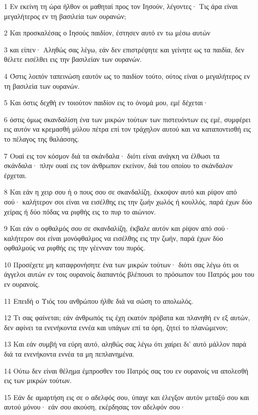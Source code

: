 \par 1 Εν εκείνη τη ώρα ήλθον οι μαθηταί προς τον Ιησούν, λέγοντες· Τις άρα είναι μεγαλήτερος εν τη βασιλεία των ουρανών;
\par 2 Και προσκαλέσας ο Ιησούς παιδίον, έστησεν αυτό εν τω μέσω αυτών
\par 3 και είπεν· Αληθώς σας λέγω, εάν δεν επιστρέψητε και γείνητε ως τα παιδία, δεν θέλετε εισέλθει εις την βασιλείαν των ουρανών.
\par 4 Όστις λοιπόν ταπεινώση εαυτόν ως το παιδίον τούτο, ούτος είναι ο μεγαλήτερος εν τη βασιλεία των ουρανών.
\par 5 Και όστις δεχθή εν τοιούτον παιδίον εις το όνομά μου, εμέ δέχεται·
\par 6 όστις όμως σκανδαλίση ένα των μικρών τούτων των πιστευόντων εις εμέ, συμφέρει εις αυτόν να κρεμασθή μύλου πέτρα επί τον τράχηλον αυτού και να καταποντισθή εις το πέλαγος της θαλάσσης.
\par 7 Ουαί εις τον κόσμον διά τα σκάνδαλα· διότι είναι ανάγκη να έλθωσι τα σκάνδαλα· πλην ουαί εις τον άνθρωπον εκείνον, διά του οποίου το σκάνδαλον έρχεται.
\par 8 Και εάν η χειρ σου ή ο πους σου σε σκανδαλίζη, έκκοψον αυτό και ρίψον από σού· καλήτερον σοι είναι να εισέλθης εις την ζωήν χωλός ή κουλλός, παρά έχων δύο χείρας ή δύο πόδας να ριφθής εις το πυρ το αιώνιον.
\par 9 Και εάν ο οφθαλμός σου σε σκανδαλίζη, έκβαλε αυτόν και ρίψον από σού· καλήτερον σοι είναι μονόφθαλμος να εισέλθης εις την ζωήν, παρά έχων δύο οφθαλμούς να ριφθής εις την γέενναν του πυρός.
\par 10 Προσέχετε μη καταφρονήσητε ένα των μικρών τούτων· διότι σας λέγω ότι οι άγγελοι αυτών εν τοις ουρανοίς διαπαντός βλέπουσι το πρόσωπον του Πατρός μου του εν ουρανοίς.
\par 11 Επειδή ο Υιός του ανθρώπου ήλθε διά να σώση το απολωλός.
\par 12 Τι σας φαίνεται; εάν άνθρωπός τις έχη εκατόν πρόβατα και πλανηθή εν εξ αυτών, δεν αφίνει τα ενενήκοντα εννέα και υπάγων επί τα όρη, ζητεί το πλανώμενον;
\par 13 Και εάν συμβή να εύρη αυτό, αληθώς σας λέγω ότι χαίρει δι' αυτό μάλλον παρά διά τα ενενήκοντα εννέα τα μη πεπλανημένα.
\par 14 Ούτω δεν είναι θέλημα έμπροσθεν του Πατρός σας του εν ουρανοίς να απολεσθή εις των μικρών τούτων.
\par 15 Εάν δε αμαρτήση εις σε ο αδελφός σου, ύπαγε και έλεγξον αυτόν μεταξύ σου και αυτού μόνου· εάν σου ακούση, εκέρδησας τον αδελφόν σου·

